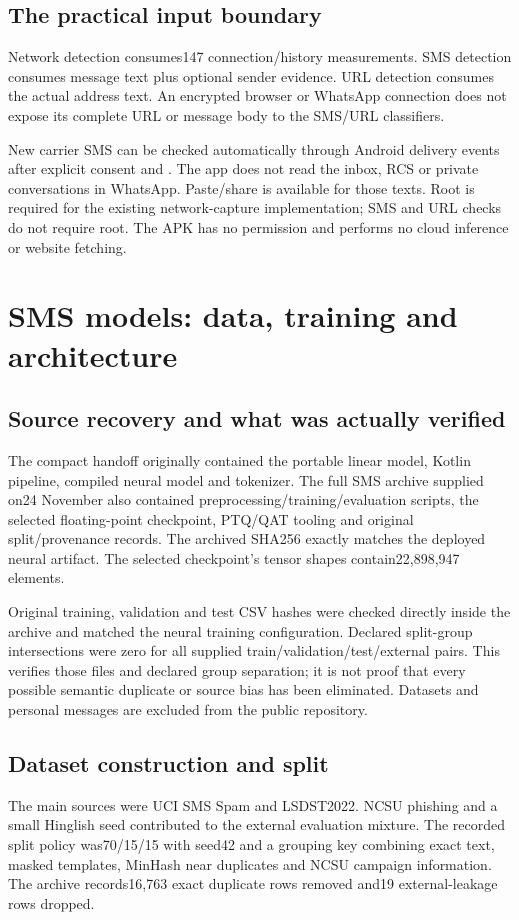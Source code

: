 \section{The practical input boundary}
Network detection consumes147 connection/history measurements. SMS detection consumes message text plus optional sender evidence. URL detection consumes the actual address text. An encrypted browser or WhatsApp connection does not expose its complete URL or message body to the SMS/URL classifiers.

New carrier SMS can be checked automatically through Android delivery events after explicit consent and . The app does not read the inbox, RCS or private conversations in WhatsApp. Paste/share is available for those texts. Root is required for the existing network-capture implementation; SMS and URL checks do not require root. The APK has no  permission and performs no cloud inference or website fetching.

\chapter{SMS models: data, training and architecture}
\section{Source recovery and what was actually verified}
The compact handoff originally contained the portable linear model, Kotlin pipeline, compiled neural model and tokenizer. The full SMS archive supplied on24 November also contained preprocessing/training/evaluation scripts, the selected floating-point checkpoint, PTQ/QAT tooling and original split/provenance records. The archived  SHA256 exactly matches the deployed neural artifact. The selected checkpoint's tensor shapes contain22,898,947 elements.

Original training, validation and test CSV hashes were checked directly inside the archive and matched the neural training configuration. Declared split-group intersections were zero for all supplied train/validation/test/external pairs. This verifies those files and declared group separation; it is not proof that every possible semantic duplicate or source bias has been eliminated. Datasets and personal messages are excluded from the public repository.

\section{Dataset construction and split}
The main sources were UCI SMS Spam and LSDST2022. NCSU phishing and a small Hinglish seed contributed to the external evaluation mixture. The recorded split policy was70/15/15 with seed42 and a grouping key combining exact text, masked templates, MinHash near duplicates and NCSU campaign information. The archive records16,763 exact duplicate rows removed and19 external-leakage rows dropped.


